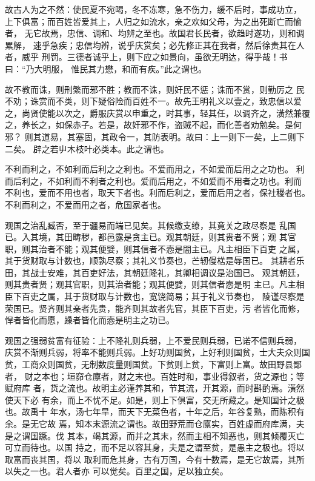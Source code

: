 \documentclass[]{article}
\begin{document}
故古人为之不然：使民夏不宛喝，冬不冻寒，急不伤力，缓不后时，事成功立，
上下俱富；而百姓皆爱其上，人归之如流水，亲之欢如父母，为之出死断亡而愉者，
无它故焉，忠信、调和、均辨之至也。故国君长民者，欲趋时遂功，则和调累解，
速乎急疾；忠信均辨，说乎庆赏矣；必先修正其在我者，然后徐责其在人者，威乎
刑罚。三德者诚乎上，则下应之如景向，虽欲无明达，得乎哉！书曰：``乃大明服，
惟民其力懋，和而有疾。''此之谓也。

故不教而诛，则刑繁而邪不胜；教而不诛，则奸民不惩；诛而不赏，则勤厉之
民不劝；诛赏而不类，则下疑俗险而百姓不一。故先王明礼义以壹之，致忠信以爱
之，尚贤使能以次之，爵服庆赏以申重之，时其事，轻其任，以调齐之，潢然兼覆
之，养长之，如保赤子。若是，故奸邪不作，盗贼不起，而化善者劝勉矣。是何邪？
则其道易，其塞固，其政令一，其防表明。故曰：上一则下一矣，上二则下二矣。
辟之若屮木枝叶必类本。此之谓也。

不利而利之，不如利而后利之之利也。不爱而用之，不如爱而后用之之功也。
利而后利之，不如利而不利者之利也。爱而后用之，不如爱而不用者之功也。利而
不利也，爱而不用也者，取天下者也。利而后利之，爱而后用之者，保社稷者也。
不利而利之，不爱而用之者，危国家者也。

观国之治乱臧否，至于疆易而端已见矣。其候缴支缭，其竟关之政尽察是
乱国已。入其境，其田畴秽，都邑露是贪主已。观其朝廷，则其贵者不贤；观
其官职，则其治者不能；观其便嬖，则其信者不悫是闇主已。凡主相臣下百吏
之属，其于货财取与计数也，顺孰尽察；其礼义节奏也，芒轫僈楛是辱国已。
其耕者乐田，其战士安难，其百吏好法，其朝廷隆礼，其卿相调议是治国已。
观其朝廷，则其贵者贤；观其官职，则其治者能；观其便嬖，则其信者悫是明
主已。凡主相臣下百吏之属，其于货财取与计数也，宽饶简易；其于礼义节奏也，
陵谨尽察是荣国已。贤齐则其亲者先贵，能齐则其故者先官，其臣下百吏，污
者皆化而修，悍者皆化而愿，躁者皆化而悫是明主之功已。

观国之强弱贫富有征验：上不隆礼则兵弱，上不爱民则兵弱，已诺不信则兵弱，
庆赏不渐则兵弱，将率不能则兵弱。上好功则国贫，上好利则国贫，士大夫众则国
贫，工商众则国贫，无制数度量则国贫。下贫则上贫，下富则上富。故田野县鄙者，
财之本也；垣窌仓廪者，财之末也。百姓时和，事业得叙者，货之源也；等赋府库
者，货之流也。故明主必谨养其和，节其流，开其源，而时斟酌焉。潢然使天下必
有余，而上不忧不足。如是，则上下俱富，交无所藏之。是知国计之极也。故禹十
年水，汤七年旱，而天下无菜色者，十年之后，年谷复熟，而陈积有余。是无它故
焉，知本末源流之谓也。故田野荒而仓廪实，百姓虚而府库满，夫是之谓国蹶。伐
其本，竭其源，而并之其末，然而主相不知恶也，则其倾覆灭亡可立而待也。以国
持之，而不足以容其身，夫是之谓至贫，是愚主之极也。将以取富而丧其国，将以
取利而危其身，古有万国，今有十数焉，是无它故焉，其所以失之一也。君人者亦
可以觉矣。百里之国，足以独立矣。
\end{document}
